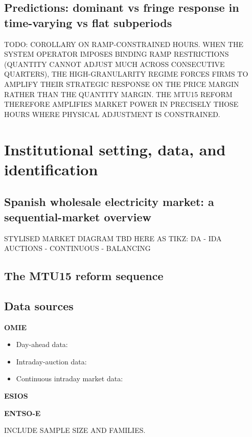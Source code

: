 \documentclass[11pt,a4paper]{article}
\begin{document}
\subsection{Predictions: dominant vs fringe response in time-varying vs flat subperiods}\label{sec:model:predictions}

TODO: COROLLARY ON RAMP-CONSTRAINED HOURS.
WHEN THE SYSTEM OPERATOR IMPOSES BINDING RAMP RESTRICTIONS (QUANTITY CANNOT ADJUST MUCH ACROSS CONSECUTIVE QUARTERS), THE HIGH-GRANULARITY REGIME FORCES FIRMS TO AMPLIFY THEIR STRATEGIC RESPONSE ON THE PRICE MARGIN RATHER THAN THE QUANTITY MARGIN. THE MTU15 REFORM THEREFORE AMPLIFIES MARKET POWER IN PRECISELY THOSE HOURS WHERE PHYSICAL ADJUSTMENT IS CONSTRAINED.


\section{Institutional setting, data, and identification}\label{sec:data}

\subsection{Spanish wholesale electricity market: a sequential-market overview}

STYLISED MARKET DIAGRAM TBD HERE AS TIKZ: DA - IDA AUCTIONS - CONTINUOUS - BALANCING

\subsection{The MTU15 reform sequence}

\subsection{Data sources}

\textbf{OMIE}
\begin{itemize}
       \item Day-ahead data:
       \item Intraday-auction data:
       \item Continuous intraday market data:
\end{itemize}

\textbf{ESIOS}


\textbf{ENTSO-E}

INCLUDE SAMPLE SIZE AND FAMILIES.
\end{document}
